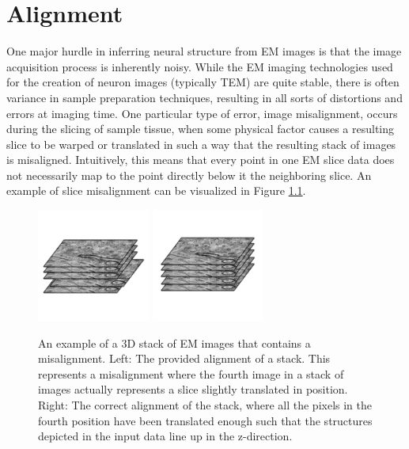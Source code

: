 \chapter{Alignment}

One major hurdle in inferring neural structure from EM images is that the image acquisition process is inherently noisy. While the EM imaging technologies used for the creation of neuron images (typically TEM) are quite stable, there is often variance in sample preparation techniques, resulting in all sorts of distortions and errors at imaging time. One particular type of error, image misalignment, occurs during the slicing of sample tissue, when some physical factor causes a resulting slice to be warped or translated in such a way that the resulting stack of images is misaligned. Intuitively, this means that every point in one EM slice data does not necessarily map to the point directly below it the neighboring slice. An example of slice misalignment can be visualized in Figure \ref{fig:misalignment_example}.

\begin{figure}[h]
    \centering
	\includegraphics[width=0.33\textwidth]{img/misalignment_example}
	\hspace{1cm}
	\includegraphics[width=0.33\textwidth]{img/alignment_example}
    \caption[An example of a 3D stack of EM images that contains a misalignment]{An example of a 3D stack of EM images that contains a misalignment. Left: The provided alignment of a stack. This represents a misalignment where the fourth image in a stack of images actually represents a slice slightly translated in position. Right: The correct alignment of the stack, where all the pixels in the fourth position have been translated enough such that the structures depicted in the input data line up in the z-direction.}
    \label{fig:misalignment_example}
\end{figure}

